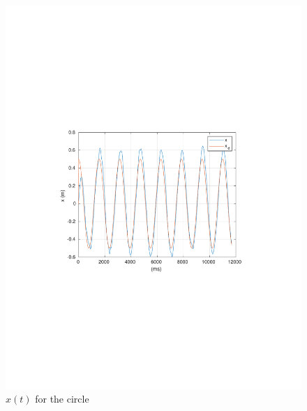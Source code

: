 \begin{frame}
	\begin{figure}[!htb]
		\centering
		\includegraphics[scale=.7,trim={3.5cm 8cm 4cm 8cm},clip]{figuras/CROB_Fuzzy_vel01_a05_circleXY/x.pdf}
		\caption{$x(t)$ for the circle}
		\label{fig:crob_circ_x}
	\end{figure}
\end{frame}
